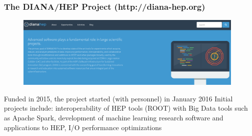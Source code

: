 \begin{frame}
\frametitle{The DIANA/HEP Project (http://diana-hep.org)}

\begin{figure}[htbp]
\begin{center}
\includegraphics[width=1.0\textwidth]{images/20160610-diana-hep-banner.png}
\end{center}
\end{figure}

Funded in 2015, the project started (with personnel) in January 2016
\vskip 0.15in
Initial projects include: interoperability of HEP tools (ROOT) with Big Data tools such as Apache Spark, development of machine learning research software and applications to HEP, I/O performance optimizations


\end{frame}


